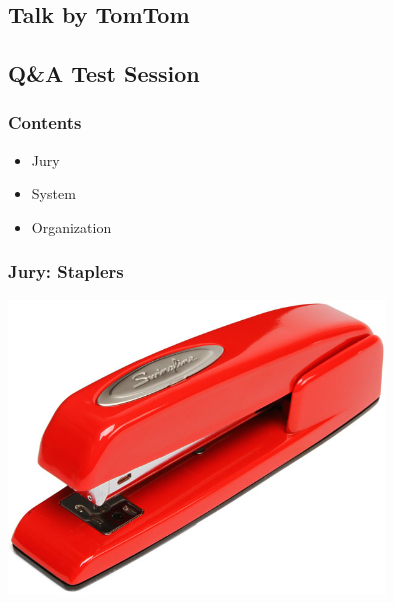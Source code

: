 \documentclass[t]{beamer}
\begin{document}
\subsection{Talk by TomTom}
\subsection{Q\&A Test Session}

\begin{frame}
	\frametitle{Contents}
		\begin{itemize}
		\item Jury
		\item System
		\item Organization
	\end{itemize}
\end{frame}


\begin{frame}
    \frametitle{Jury: Staplers}
	\includegraphics[width=100mm]{stapler.jpg}
\end{frame}
\end{document}

